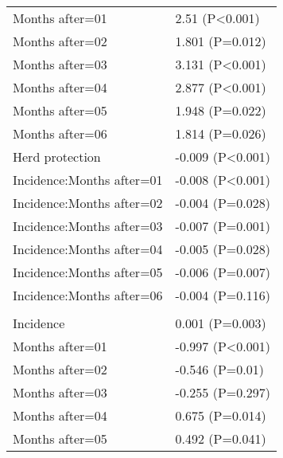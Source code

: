 \documentclass[]{article}
\begin{document}
\begin{longtable}[t]{ll}
\hspace{1em}Months after=01 & 2.51 (P<0.001)\\
\hspace{1em}Months after=02 & 1.801 (P=0.012)\\
\hspace{1em}Months after=03 & 3.131 (P<0.001)\\
\hspace{1em}Months after=04 & 2.877 (P<0.001)\\
\hspace{1em}Months after=05 & 1.948 (P=0.022)\\
\hspace{1em}Months after=06 & 1.814 (P=0.026)\\
\hspace{1em}Herd protection & -0.009 (P<0.001)\\
\hspace{1em}Incidence:Months after=01 & -0.008 (P<0.001)\\
\hspace{1em}Incidence:Months after=02 & -0.004 (P=0.028)\\
\hspace{1em}Incidence:Months after=03 & -0.007 (P=0.001)\\
\hspace{1em}Incidence:Months after=04 & -0.005 (P=0.028)\\
\hspace{1em}Incidence:Months after=05 & -0.006 (P=0.007)\\
\hspace{1em}Incidence:Months after=06 & -0.004 (P=0.116)\\
\addlinespace[1.5em]
\multicolumn{2}{l}{\textbf{Temporary field worker}}\\
\hspace{1em}Incidence & 0.001 (P=0.003)\\
\hspace{1em}Months after=01 & -0.997 (P<0.001)\\
\hspace{1em}Months after=02 & -0.546 (P=0.01)\\
\hspace{1em}Months after=03 & -0.255 (P=0.297)\\
\hspace{1em}Months after=04 & 0.675 (P=0.014)\\
\hspace{1em}Months after=05 & 0.492 (P=0.041)\\

\end{longtable}
\end{document}

